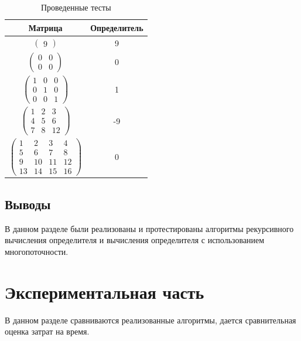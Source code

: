 \documentclass[a4paper,oneside,14pt]{extreport}
\begin{document}
\begin{table}[H]
	\begin{center}
		\captionsetup{justification=raggedleft, singlelinecheck=false}
		\caption[]{\label{tab:tests} Проведенные тесты}

	\begin{tabular}{|c|c|}
		\hline
		\rule[-1ex]{0pt}{2.5ex} Матрица & Определитель \\
		\hline
		\rule[-1ex]{0pt}{2.5ex} $\begin{pmatrix}
		9
		\end{pmatrix}$ & 9
		\\
		\hline
		\rule[-1ex]{0pt}{2.5ex} $\begin{pmatrix}
			0 & 0 \\
			0 & 0
		\end{pmatrix}$ & 0
		\\
		\hline
		\rule[-1ex]{0pt}{2.5ex} $\begin{pmatrix}
			1 & 0 & 0 \\
			0 & 1 & 0 \\
			0 & 0 & 1
		\end{pmatrix}$ & 1
		 \\
		\hline
		\rule[-1ex]{0pt}{2.5ex}	$\begin{pmatrix}
			1 & 2 & 3 \\
			4 & 5 & 6 \\
			7 & 8 & 12
		\end{pmatrix}$ & -9
		\\
		\hline
		\rule[-1ex]{0pt}{2.5ex} $\begin{pmatrix}
			1 & 2 & 3 & 4 \\
			5 & 6 & 7 & 8 \\
			9 & 10 & 11 & 12 \\
			13 & 14 & 15 & 16
		\end{pmatrix}$ & 0
		 \\
		 \hline
	\end{tabular}
\end{center}
\end{table}
\section{Выводы}
В данном разделе были реализованы и протестированы алгоритмы рекурсивного вычисления определителя и вычисления определителя с использованием многопоточности.
\newpage

\chapter{Экспериментальная часть}
В данном разделе сравниваются реализованные алгоритмы, дается сравнительная оценка затрат на время.
\end{document}
